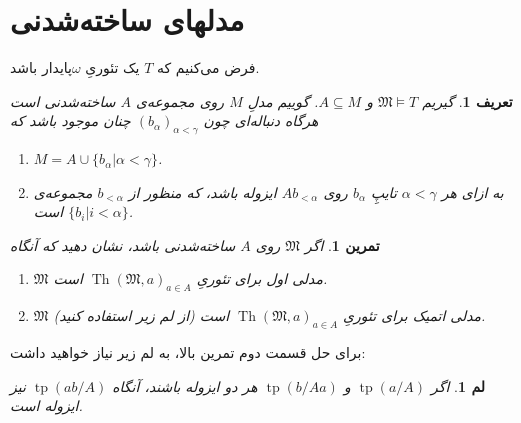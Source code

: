 \documentclass[12pt,a4paper]{report}
\theoremstyle{colorhead}
\newtheorem{tam}[thm]{تمرین}
\newtheorem{defn}[thm]{تعریف}
\newtheorem{lem}[thm]{لم}
\DeclareMathOperator{\Th}{Th}
\DeclareMathOperator{\tp}{tp}
\begin{document}
\section{مدلهای ساخته‌شدنی}
فرض می‌کنیم که 
$T$
یک تئوریِ
$\omega$پایدار
باشد.
\begin{defn}
	گیریم
	$\mathfrak{M}\models T$
	و
	$A\subseteq M$.
	گوییم
	مدلِ
	$M$
	روی مجموعه‌ی
	$A$
	ساخته‌شدنی 
	است هرگاه دنباله‌ای چون
	$(b_\alpha)_{\alpha<\gamma}$
	چنان موجود باشد که
	\begin{enumerate}
		\item 
		$M=A\cup \{b_\alpha|\alpha<\gamma\}$.
		\item 
		به ازای هر
		$\alpha<\gamma$
		تایپِ
		$b_\alpha$
		روی
		$Ab_{<\alpha}$
		ایزوله باشد، که منظور از
	$b_{<\alpha}$
	مجموعه‌ی
		\mbox{$\{b_i|i<\alpha\}$}
	است. 
	\end{enumerate}
	\end{defn}
\begin{tam}
اگر
$\mathfrak{M}$
روی
$A$
ساخته‌شدنی باشد، نشان دهید که آنگاه 
\begin{enumerate}
\item 
$\mathfrak{M}$
مدلی اول برای تئوریِ
$\Th(\mathfrak{M},a)_{a\in A}$
است.
\item 
$\mathfrak{M}$
مدلی اتمیک برای تئوریِ
$\Th(\mathfrak{M},a)_{a\in A}$
است (از لم زیر استفاده کنید).
\end{enumerate}
\end{tam}
برای حل قسمت دوم تمرین بالا، به لم زیر نیاز خواهید داشت:
\begin{lem}
اگر
$\tp(a/A)$
و
$\tp(b/Aa)$
هر دو ایزوله باشند، آنگاه
$\tp(ab/A)$
نیز ایزوله است. 
\end{lem}
\end{document}
